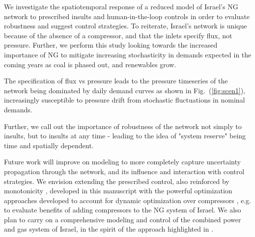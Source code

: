 We investigate the spatiotemporal response of a reduced model of Israel's NG network to prescribed insults and human-in-the-loop controls in order to evaluate robustness and suggest control strategies. To reiterate, Israel's network is unique because of the absence of a compressor, and that the inlets specify flux, not pressure. Further, we perform this study looking towards the increased importance of NG to mitigate increasing stochasticity in demands expected in the coming years as coal is phased out, and renewables grow.

The specification of flux vs pressure leads to the pressure timeseries of the network being dominated by daily demand curves as shown in Fig.~(\ref{fig:scen1}), increasingly susceptible to pressure drift from stochastic fluctuations in nominal demands.

Further, we call out the importance of robustness of the network not simply to insults, but to insults at any time - leading to the idea of "system reserve" being time and spatially dependent.

Future work will improve on modeling to more completely capture uncertainty propagation through the network, and its influence and interaction with control strategies. We envision extending the prescribed control, also reinforced by monotonicity \cite{Vuffray2015Monotonicity,zlotnik_monotonicity_2016}, developed in this manuscript with the powerful optimization approaches developed to account for dynamic optimization over compressors \cite{rachford_optimizing_2000,carter_optimizing_2003,rachford_using_2009,zlotnik_optimal_2015,zlotnik_using_2016}, e.g. to evaluate benefits of adding compressors to the NG system of Israel. We also plan to carry on a comprehensive modeling and control of the combined power and gas system of Israel, in the spirit of the approach highlighted in \cite{carter_impact_2016,Zlotnik2017Coordinated}. 